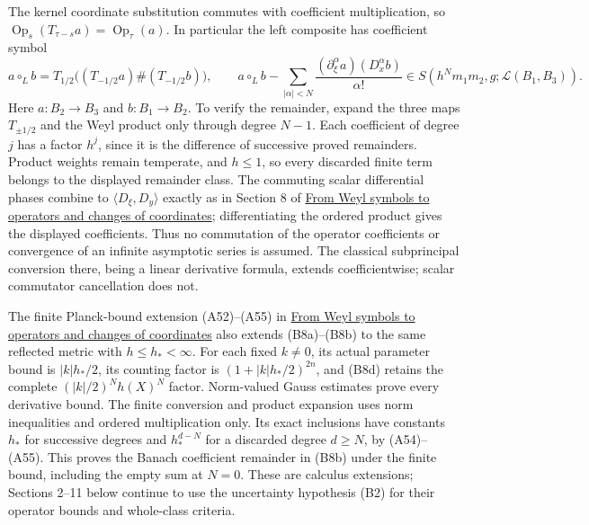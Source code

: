 \documentclass[
  11pt,
]{article}
\begin{document}
The kernel coordinate substitution commutes with coefficient
multiplication, so
\(\operatorname{Op}_s(T_{\tau-s}a)=\operatorname{Op}_\tau(a)\). In
particular the left composite has coefficient symbol \[
 a\circ_Lb=T_{1/2}\big((T_{-1/2}a)\#(T_{-1/2}b)\big),\qquad
 a\circ_Lb-\sum_{|\alpha|<N}\frac{(\partial_\xi^\alpha a)(D_x^\alpha b)}{\alpha!}
 \in S(h^Nm_1m_2,g;\mathcal L(B_1,B_3)).
 \tag{B8b}
\] Here \(a:B_2\to B_3\) and \(b:B_1\to B_2\). To verify the remainder,
expand the three maps \(T_{\pm1/2}\) and the Weyl product only through
degree \(N-1\). Each coefficient of degree \(j\) has a factor \(h^j\),
since it is the difference of successive proved remainders. Product
weights remain temperate, and \(h\le1\), so every discarded finite term
belongs to the displayed remainder class. The commuting scalar
differential phases combine to \(\langle D_\xi,D_y\rangle\) exactly as
in Section 8 of \href{weyl-covariance-action.pdf}{From Weyl symbols to
operators and changes of coordinates}; differentiating the ordered
product gives the displayed coefficients. Thus no commutation of the
operator coefficients or convergence of an infinite asymptotic series is
assumed. The classical subprincipal conversion there, being a linear
derivative formula, extends coefficientwise; scalar commutator
cancellation does not.

The finite Planck-bound extension (A52)--(A55) in
\href{weyl-covariance-action.pdf}{From Weyl symbols to operators and
changes of coordinates} also extends (B8a)--(B8b) to the same reflected
metric with \(h\le h_*<\infty\). For each fixed \(k\ne0\), its actual
parameter bound is \(|k|h_*/2\), its counting factor is
\((1+|k|h_*/2)^{2n}\), and (B8d) retains the complete
\((|k|/2)^Nh(X)^N\) factor. Norm-valued Gauss estimates prove every
derivative bound. The finite conversion and product expansion uses norm
inequalities and ordered multiplication only. Its exact inclusions have
constants \(h_*\) for successive degrees and \(h_*^{d-N}\) for a
discarded degree \(d\ge N\), by (A54)--(A55). This proves the Banach
coefficient remainder in (B8b) under the finite bound, including the
empty sum at \(N=0\). These are calculus extensions; Sections 2--11
below continue to use the uncertainty hypothesis (B2) for their operator
bounds and whole-class criteria.
\end{document}
